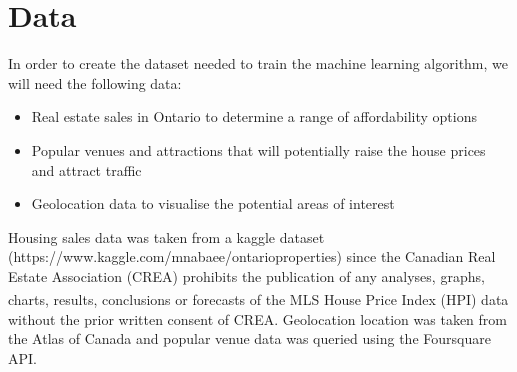 \documentclass{article}
\begin{document}
\section{Data}

In order to create the dataset needed to train the machine learning algorithm, we will need the following data:

\begin{itemize}
	\item Real estate sales in Ontario to determine a range of affordability options
	\item Popular venues and attractions that will potentially raise the house prices and attract traffic
	\item Geolocation data to visualise the potential areas of interest  
\end{itemize}

Housing sales data was taken from a kaggle dataset (https://www.kaggle.com/mnabaee/ontarioproperties) since the Canadian Real Estate Association (CREA) prohibits the publication of any analyses, graphs, charts, results, conclusions or forecasts of the MLS\textsuperscript{\textregistered} House Price Index (HPI) data without the prior written consent of CREA. Geolocation location was taken from the Atlas of Canada and popular venue data was queried using the Foursquare API. 
\end{document}
